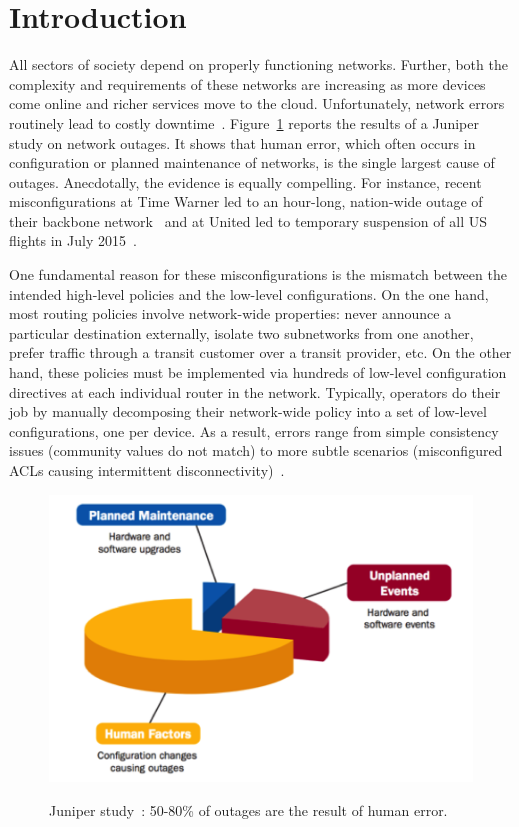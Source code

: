 \section{Introduction}

All sectors of society depend on properly functioning networks.  Further, both the complexity and requirements of these networks are increasing as more devices come online and richer services move to the cloud.  Unfortunately, network errors routinely lead to costly downtime~\cite{mahajan+:bgp-misconfiguration,feamster+:rcc,batfish,dc-failure-study}.
Figure~\ref{fig:network-downtime} reports the results of a Juniper
study on network outages.  It shows that human error, which often occurs in configuration or planned maintenance of networks, is the single largest cause of outages. 
Anecdotally, the evidence is equally compelling.  For instance, recent misconfigurations at
Time Warner led to an hour-long, nation-wide outage of their backbone network~\cite{time-warner} and at United led to temporary suspension of all US flights in July 2015~\cite{united}.

One fundamental reason for these misconfigurations is the
mismatch between the intended high-level
policies and the low-level configurations.  On the one hand, most routing policies involve
network-wide properties:  never announce a particular destination externally, isolate two subnetworks from one another, prefer traffic through a transit customer over a transit provider, etc.
On the other hand, these policies must be implemented via hundreds of low-level configuration directives at each individual router in the network.  Typically, operators do their job by manually
decomposing their network-wide policy into a set of low-level configurations,
one per device.  As a result, errors range from simple consistency issues (community values do not match) to more subtle scenarios (misconfigured ACLs causing intermittent disconnectivity)~\cite{feamster+:rcc,batfish}.

\begin{figure}
  \centering
  \includegraphics[width=.35\textwidth]{figures/errors2} \\
  \caption{
Juniper study~\cite{juniper-study}: 50-80\% of outages are the result of human error.}
  \label{fig:network-downtime}
\end{figure}

